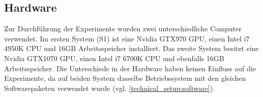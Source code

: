 \subsection{Hardware}
\label{technichal_setup:hardware}
Zur Durchführung der Experimente wurden zwei unterschiedliche Computer verwendet. Im ersten System (S1) ist eine Nvidia GTX970 GPU, einen Intel i7 4950K CPU und 16GB Arbeitsspeicher installiert. Das zweite System besitzt eine Nvidia GTX1070 GPU, einen Intel i7 6700K CPU und ebenfalls 16GB Arbeitsspeicher. Die Unterschiede in der Hardware haben keinen Einfluss auf die Experimente, da auf beiden System dasselbe Betriebssystem mit den gleichen Softwarepaketen verwendet wurde (vgl. \ref{technical_setup:software}).

